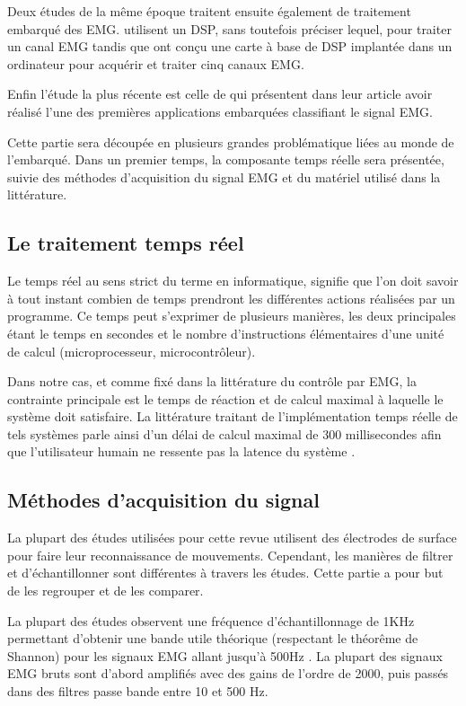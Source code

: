 \documentclass[letterpaper, twoside, 12pt, memoire, creativecommons, hyperref]{thETS}
\begin{document}
Deux études de la même époque traitent ensuite également de traitement embarqué des EMG. \cite{martinez1999} utilisent un DSP, sans toutefois préciser lequel, pour traiter un canal EMG tandis que \cite{Prasad1996} ont conçu une carte à base de DSP implantée dans un ordinateur pour acquérir et traiter cinq canaux EMG.

Enfin l'étude la plus récente est celle de \cite{Tenore2007} qui présentent dans leur article avoir réalisé l'une des premières applications embarquées classifiant le signal EMG.

Cette partie sera découpée en plusieurs grandes problématique liées au monde de l'embarqué. Dans un premier temps, la composante temps réelle sera présentée, suivie des méthodes d'acquisition du signal EMG et du matériel utilisé dans la littérature.

\subsection{Le traitement temps réel}

Le temps réel au sens strict du terme en informatique, signifie que l’on doit savoir à tout instant combien de temps prendront les différentes actions réalisées par un programme. Ce temps peut s'exprimer de plusieurs manières, les deux principales étant le temps en secondes et le nombre d'instructions élémentaires d'une unité de calcul (microprocesseur, microcontrôleur).

Dans notre cas, et comme fixé dans la littérature du contrôle par EMG, la contrainte principale est le temps de réaction et de calcul maximal à laquelle le système doit satisfaire. La littérature traitant de l’implémentation temps réelle de tels systèmes parle ainsi d’un délai de calcul maximal de 300 millisecondes afin que l’utilisateur humain ne ressente pas la latence du système \citep{Chu2007, Englehart2003}.

\subsection{Méthodes d'acquisition du signal}

La plupart des études utilisées pour cette revue utilisent des électrodes de surface pour faire leur reconnaissance de mouvements. Cependant, les manières de filtrer et d'échantillonner sont différentes à travers les études. Cette partie a pour but de les regrouper et de les comparer. 

La plupart des études observent une fréquence d’échantillonnage de 1KHz permettant d’obtenir une bande utile théorique (respectant le théorême de Shannon) pour les signaux EMG allant jusqu’à 500Hz \citep{Chang1996, Chu2007, Englehart2003, Tenore2007}. 
La plupart des signaux EMG bruts sont d'abord amplifiés avec des gains de l’ordre de 2000, puis passés dans des filtres passe bande entre 10 et 500 Hz.
\end{document}
